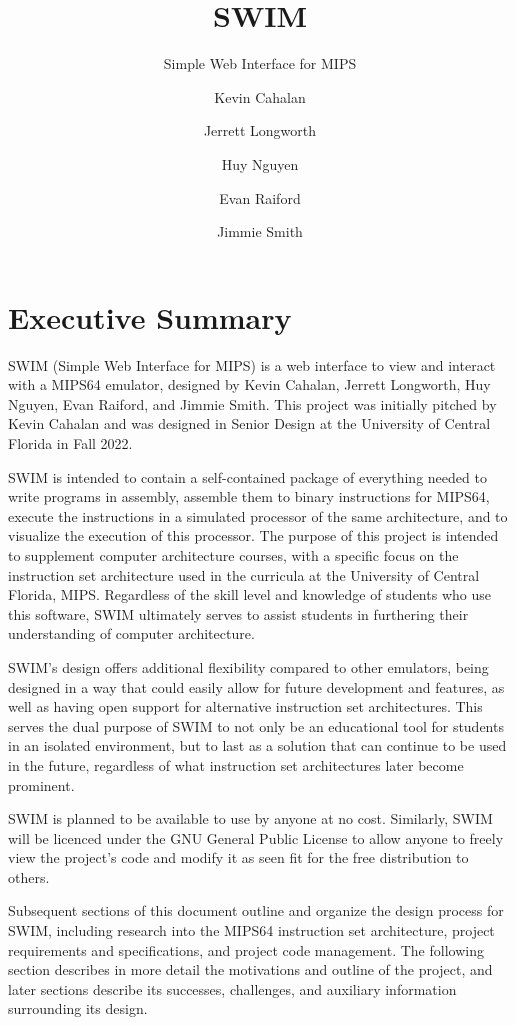 \documentclass[parskip=half, fontsize=12pt]{scrartcl}
\title{SWIM}
\subtitle{Simple Web Interface for MIPS}
\author{
    Kevin Cahalan
    \and
    Jerrett Longworth
    \and
    Huy Nguyen
    \and
    Evan Raiford
    \and
    Jimmie Smith
}
\date{}
\let\oldsection\section
\renewcommand\section{\newpage\oldsection}
\begin{document}
\renewcommand*{\titlepagestyle}{empty}
\maketitle
\clearpage


\setcounter{page}{1}
\tableofcontents
\clearpage

\section{Executive Summary}

SWIM (Simple Web Interface for MIPS) is a web interface to view and interact with a MIPS64 emulator, designed by Kevin Cahalan, Jerrett Longworth, Huy Nguyen, Evan Raiford, and Jimmie Smith. This project was initially pitched by Kevin Cahalan and was designed in Senior Design at the University of Central Florida in Fall 2022.

SWIM is intended to contain a self-contained package of everything needed to write programs in assembly, assemble them to binary instructions for MIPS64, execute the instructions in a simulated processor of the same architecture, and to visualize the execution of this processor. The purpose of this project is intended to supplement computer architecture courses, with a specific focus on the instruction set architecture used in the curricula at the University of Central Florida, MIPS. Regardless of the skill level and knowledge of students who use this software, SWIM ultimately serves to assist students in furthering their understanding of computer architecture.

SWIM's design offers additional flexibility compared to other emulators, being designed in a way that could easily allow for future development and features, as well as having open support for alternative instruction set architectures. This serves the dual purpose of SWIM to not only be an educational tool for students in an isolated environment, but to last as a solution that can continue to be used in the future, regardless of what instruction set architectures later become prominent.

SWIM is planned to be available to use by anyone at no cost. Similarly, SWIM will be licenced under the GNU General Public License to allow anyone to freely view the project's code and modify it as seen fit for the free distribution to others.

Subsequent sections of this document outline and organize the design process for SWIM, including research into the MIPS64 instruction set architecture, project requirements and specifications, and project code management. The following section describes in more detail the motivations and outline of the project, and later sections describe its successes, challenges, and auxiliary information surrounding its design.
\end{document}
